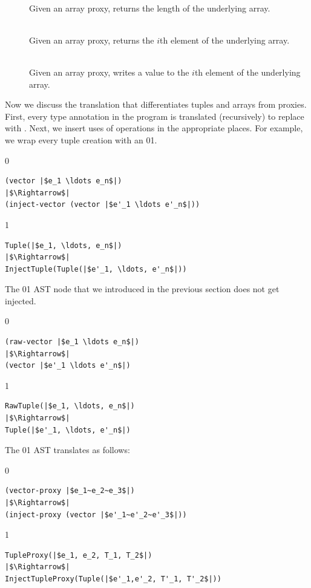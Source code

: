 \documentclass[7x10]{TimesAPriori_MIT}%
\def\racketEd{0}
\def\pythonEd{1}
\providecommand{\BookEdition}{1}
\let\edition\BookEdition
\newcommand{\racket}[1]{{\if\edition\racketEd{#1}\fi}}
\newcommand{\pythonColor}[0]{}
\newcommand{\python}[1]{{\if\edition\pythonEd\pythonColor #1\fi}}
\numberwithin{theorem}{chapter}
\numberwithin{definition}{chapter}
\numberwithin{equation}{chapter}
\begin{document}
{\begin{description}
\item[]\ \\
%
  Given an array proxy, returns the length of the underlying array.
  
\item[]\ \\
%
  Given an array proxy, returns the $i$th element of the underlying
  array.

\item[]\ \\
%  
    Given an array proxy, writes a value to the $i$th element of the
    underlying array.
\end{description}

\fi}

Now we discuss the translation that differentiates tuples and arrays
from proxies. First, every type annotation in the program is
translated (recursively) to replace \TUPLETYPENAME{} with \PTUPLETYNAME{}.
Next, we insert uses of \PTUPLETYNAME{} operations in the appropriate
places. For example, we wrap every tuple creation with an
\racket{}\python{}.
%
{\if\edition\racketEd
\begin{minipage}{0.96\textwidth}
\begin{lstlisting}
(vector |$e_1 \ldots e_n$|)
|$\Rightarrow$|
(inject-vector (vector |$e'_1 \ldots e'_n$|))
\end{lstlisting}
\end{minipage}
\fi}
{\if\edition\pythonEd\pythonColor    
\begin{lstlisting}
Tuple(|$e_1, \ldots, e_n$|)
|$\Rightarrow$|
InjectTuple(Tuple(|$e'_1, \ldots, e'_n$|))
\end{lstlisting}
\fi}

The \racket{}\python{}
AST node that we introduced in the previous
section does not get injected.
{\if\edition\racketEd    
\begin{lstlisting}
(raw-vector |$e_1 \ldots e_n$|)
|$\Rightarrow$|
(vector |$e'_1 \ldots e'_n$|)
\end{lstlisting}
\fi}
{\if\edition\pythonEd\pythonColor    
\begin{lstlisting}
RawTuple(|$e_1, \ldots, e_n$|)
|$\Rightarrow$|
Tuple(|$e'_1, \ldots, e'_n$|)
\end{lstlisting}
\fi}

The \racket{}\python{} AST
translates as follows:
%
{\if\edition\racketEd    
\begin{lstlisting}
(vector-proxy |$e_1~e_2~e_3$|)
|$\Rightarrow$|
(inject-proxy (vector |$e'_1~e'_2~e'_3$|))
\end{lstlisting}
\fi}
{\if\edition\pythonEd\pythonColor
\begin{lstlisting}
TupleProxy(|$e_1, e_2, T_1, T_2$|)
|$\Rightarrow$|
InjectTupleProxy(Tuple(|$e'_1,e'_2, T'_1, T'_2$|))
\end{lstlisting}
\fi}
\end{document}

